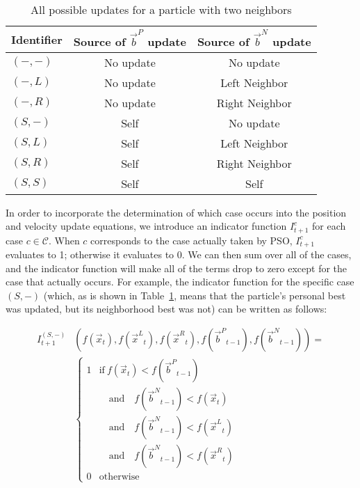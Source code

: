 \documentclass[ms,electronic,twosidetoc,letterpaper,chaptercenter,parttop,equalmargins]{byumsphd}
\providecommand{\pers}{\ensuremath{P}}
\providecommand{\neigh}{\ensuremath{N}}
\providecommand{\leftind}{\ensuremath{L}}
\providecommand{\rightind}{\ensuremath{R}}
\providecommand{\ppos}{\ensuremath{\Vec{x}}}
\providecommand{\nbest}{\ensuremath{\Vec{b}^\neigh}}
\providecommand{\pbest}{\ensuremath{\Vec{b}^\pers}}
\providecommand{\ofunc}{\ensuremath{f}}
\providecommand{\indic}{\ensuremath{I}}
\providecommand{\leftn}{\ensuremath{\Vec{x}^\leftind}}
\providecommand{\rightn}{\ensuremath{\Vec{x}^\rightind}}
\providecommand{\caseset}{\ensuremath{\mathcal{C}}}
\providecommand{\casegen}{\ensuremath{c}}
\providecommand{\casexn}{\ensuremath{(S,-)}}
\providecommand{\casexx}{\ensuremath{(S,S)}}
\providecommand{\casexl}{\ensuremath{(S,\leftind)}}
\providecommand{\casexr}{\ensuremath{(S,\rightind)}}
\providecommand{\casepn}{\ensuremath{(-,-)}}
\providecommand{\casepl}{\ensuremath{(-,\leftind)}}
\providecommand{\casepr}{\ensuremath{(-,\rightind)}}
\begin{document}
\begin{table}
  \caption{All possible updates for a particle with two neighbors}
  \label{tab:evals}
  \centering
  \begin{tabular}{lcc}
	Identifier&Source of $\pbest$ update&Source of $\nbest$ update\\
	\hline
	\hline
	$\casepn$&No update&No update\\
	\hline
	$\casepl$&No update&Left Neighbor\\
	\hline
	$\casepr$&No update&Right Neighbor\\
	\hline
	$\casexn$&Self&No update\\
	\hline
	$\casexl$&Self&Left Neighbor\\
	\hline
	$\casexr$&Self&Right Neighbor\\
	\hline
	$\casexx$&Self&Self\\
	\hline
  \end{tabular}
\end{table}

In order to incorporate the determination of which case occurs into the
position and velocity update equations, we introduce an indicator function
$\indic_{t+1}^{\casegen}$ for each case $\casegen \in \caseset$.  When
$\casegen$ corresponds to the case actually taken by PSO,
$\indic_{t+1}^{\casegen}$ evaluates to 1; otherwise it evaluates to 0.  We can
then sum over all of the cases, and the indicator function will make all of the
terms drop to zero except for the case that actually occurs.  For example, the
indicator function for the specific case $\casexn$ (which, as is shown in
Table~\ref{tab:evals}, means that the particle's personal best was updated, but
its neighborhood best was not) can be written as follows:

\begin{align}
  \nonumber
	\indic_{t+1}^{\casexn} & (\ofunc ( \ppos_{t} ) ,\ofunc(\leftn_{t}),
	\ofunc(\rightn_{t}) ,\ofunc(\pbest_{t-1}) ,\ofunc(\nbest_{t-1}))= \\
  \label{eq:deficasexn}
	&\begin{cases}
	   1 & \text{if} \ \ofunc(\ppos_{t}) < \ofunc(\pbest_{t-1}) \\
	   &\quad \text{and} \quad \ofunc(\nbest_{t-1}) < \ofunc(\ppos_{t}) \\
	   &\quad \text{and} \quad \ofunc(\nbest_{t-1}) < \ofunc(\leftn_{t}) \\
	   &\quad \text{and} \quad \ofunc(\nbest_{t-1}) < \ofunc(\rightn_{t}) \\
	   0 & \text{otherwise}
	\end{cases}
\end{align}
\end{document}
